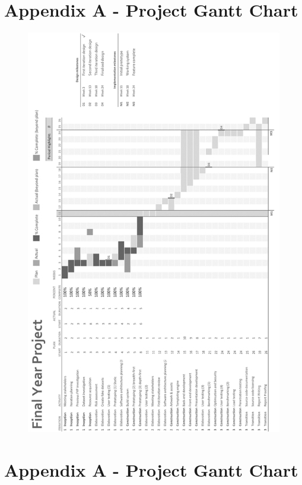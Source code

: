 \documentclass[12pt,a4paper]{article}
\begin{document}
\newpage
\section{Appendix A - Project Gantt Chart}

\begin{figure}[H]
\centering
\includegraphics{assets/gantt-plan.png}
\label{fig:graph-interval-dropped}
\end{figure}

\newpage
\section{Appendix A - Project Gantt Chart}
\end{document}

